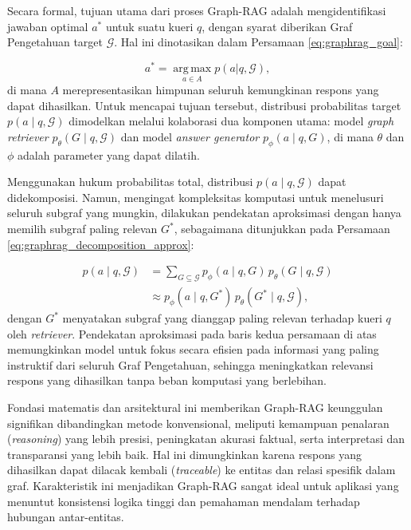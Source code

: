 Secara formal, tujuan utama dari proses Graph-RAG adalah mengidentifikasi jawaban optimal $a^*$ untuk suatu kueri $q$, dengan syarat diberikan Graf Pengetahuan target $\mathcal{G}$. Hal ini dinotasikan dalam Persamaan \ref{eq:graphrag_goal}:

\begin{equation}
	a^* = \operatorname*{arg\,max}_{a \in A} p(a|q, \mathcal{G}),
	\label{eq:graphrag_goal}
\end{equation}
di mana $A$ merepresentasikan himpunan seluruh kemungkinan respons yang dapat dihasilkan. Untuk mencapai tujuan tersebut, distribusi probabilitas target $p(a \mid q, \mathcal{G})$ dimodelkan melalui kolaborasi dua komponen utama: model \textit{graph retriever} $p_\theta(G \mid q, \mathcal{G})$ dan model \textit{answer generator} $p_\phi(a \mid q, G)$, di mana $\theta$ dan $\phi$ adalah parameter yang dapat dilatih.

Menggunakan hukum probabilitas total, distribusi $p(a \mid q, \mathcal{G})$ dapat didekomposisi. Namun, mengingat kompleksitas komputasi untuk menelusuri seluruh subgraf yang mungkin, dilakukan pendekatan aproksimasi dengan hanya memilih subgraf paling relevan $G^*$, sebagaimana ditunjukkan pada Persamaan \ref{eq:graphrag_decomposition_approx}:

\begin{equation}
\begin{split}
	p(a \mid q, \mathcal{G}) &= \sum_{G \subseteq \mathcal{G}} p_\phi(a \mid q, G)\, p_\theta(G \mid q, \mathcal{G}) \\
    &\approx p_\phi(a \mid q, G^*)\, p_\theta(G^* \mid q, \mathcal{G}),
\end{split}
\label{eq:graphrag_decomposition_approx}
\end{equation}
dengan $G^*$ menyatakan subgraf yang dianggap paling relevan terhadap kueri $q$ oleh \textit{retriever}. Pendekatan aproksimasi pada baris kedua persamaan di atas memungkinkan model untuk fokus secara efisien pada informasi yang paling instruktif dari seluruh Graf Pengetahuan, sehingga meningkatkan relevansi respons yang dihasilkan tanpa beban komputasi yang berlebihan.

Fondasi matematis dan arsitektural ini memberikan Graph-RAG keunggulan signifikan dibandingkan metode konvensional, meliputi kemampuan penalaran (\textit{reasoning}) yang lebih presisi, peningkatan akurasi faktual, serta interpretasi dan transparansi yang lebih baik. Hal ini dimungkinkan karena respons yang dihasilkan dapat dilacak kembali (\textit{traceable}) ke entitas dan relasi spesifik dalam graf. Karakteristik ini menjadikan Graph-RAG sangat ideal untuk aplikasi yang menuntut konsistensi logika tinggi dan pemahaman mendalam terhadap hubungan antar-entitas.